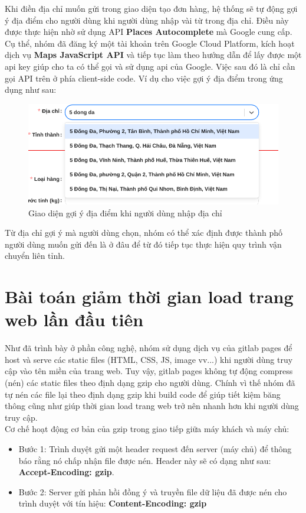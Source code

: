 		  Khi điền địa chỉ muốn gửi trong giao diện tạo đơn hàng, hệ thống sẽ tự động gợi ý địa điểm cho người dùng khi người dùng nhập vài từ trong địa chỉ. Điều này được thực hiện nhờ sử dụng API \textbf{Places Autocomplete} mà Google cung cấp. Cụ thể, nhóm đã đăng ký một tài khoản trên Google Cloud Platform, kích hoạt dịch vụ \textbf{Maps JavaScript API} và tiếp tục làm theo hướng dẫn để lấy được một api key giúp cho ta có thể gọi và sử dụng api của Google. Việc sau đó là chỉ cần gọi API trên ở phía client-side code. Ví dụ cho việc gợi ý địa điểm trong ứng dụng như sau:
		  
		  \begin{figure}[H]
		  	\centering
		  	\includegraphics[width=1\linewidth]{Images/FE_Problems/places_autocomplete}
		  	\linebreak
		  	\caption{Giao diện gợi ý địa điểm khi người dùng nhập địa chỉ}
		  \end{figure}
		
			Từ địa chỉ gợi ý mà người dùng chọn, nhóm có thể xác định được thành phố người dùng muốn gửi đến là ở đâu để từ đó tiếp tục thực hiện quy trình vận chuyển liên tỉnh.
			
			\section{Bài toán giảm thời gian load trang web lần đầu tiên}
			
			Như đã trình bày ở phần công nghệ, nhóm sử dụng dịch vụ của gitlab pages để host và serve các static files (HTML, CSS, JS, image vv...) khi người dùng truy cập vào tên miền của trang web. Tuy vậy, gitlab pages không tự động compress (nén) các static files theo định dạng gzip cho người dùng. Chính vì thế nhóm đã tự nén các file lại theo định dạng gzip khi build code để giúp tiết kiệm băng thông cũng như giúp thời gian load trang web trở nên nhanh hơn khi người dùng truy cập.\\
			
			Cơ chế hoạt động cơ bản của gzip trong giao tiếp giữa máy khách và máy chủ:
			\begin{itemize}
				\item Bước 1: Trình duyệt gửi một header request đến server (máy chủ) để thông báo rằng nó chấp nhận file được nén. Header này sẽ có dạng như sau: \textbf{Accept-Encoding: gzip}.
				\item Bước 2: Server gửi phản hồi đồng ý và truyền file dữ liệu đã được nén cho trình duyệt với tín hiệu: \textbf{Content-Encoding: gzip}
			\end{itemize}
			